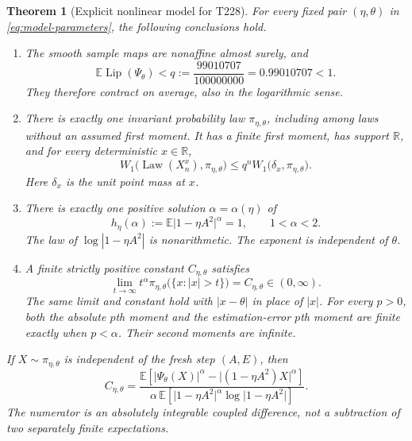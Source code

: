 \documentclass[11pt,a4paper]{article}
\numberwithin{equation}{section}
\newtheorem{theorem}{Theorem}[section]
\theoremstyle{remark}
\DeclareMathOperator{\Lip}{Lip}
\DeclareMathOperator{\Law}{Law}
\newcommand{\E}{\mathbb E}
\newcommand{\R}{\mathbb R}
\newcommand{\abs}[1]{\lvert#1\rvert}
\begin{document}
\begin{theorem}[Explicit nonlinear model for T228]\label{thm:main}
For every fixed pair $(\eta,\theta)$ in \eqref{eq:model-parameters}, the
following conclusions hold.
\begin{enumerate}[label=\textnormal{(\roman*)}]
\item The smooth sample maps are nonaffine almost surely, and
\begin{equation}
 \E\Lip(\Psi_\theta)<q:=\frac{99010707}{100000000}
 =0.99010707<1.\label{eq:q-main}
\end{equation}
They therefore contract on average, also in the logarithmic sense.
\item There is exactly one invariant probability law $\pi_{\eta,\theta}$,
including among laws without an assumed first moment. It has a finite
first moment, has support $\R$, and for every deterministic $x\in\R$,
\begin{equation}
 W_1\bigl(\Law(X_n^x),\pi_{\eta,\theta}\bigr)
 \le q^n W_1\bigl(\delta_x,\pi_{\eta,\theta}\bigr).
 \label{eq:wasserstein}
\end{equation}
Here $\delta_x$ is the unit point mass at $x$.
\item There is exactly one positive solution $\alpha=\alpha(\eta)$ of
\begin{equation}
 h_\eta(\alpha):=\E\abs{1-\eta A^2}^\alpha=1,
 \qquad 1<\alpha<2.\label{eq:alpha-main}
\end{equation}
The law of $\log|1-\eta A^2|$ is nonarithmetic. The exponent is independent
of $\theta$.
\item A finite strictly positive constant $C_{\eta,\theta}$ satisfies
\begin{equation}
 \lim_{t\to\infty}t^\alpha\pi_{\eta,\theta}
 \bigl(\{x:\abs{x}>t\}\bigr)=C_{\eta,\theta}\in(0,\infty).
 \label{eq:tail-main}
\end{equation}
The same limit and constant hold with $|x-\theta|$ in place of $|x|$.
For every $p>0$, both the absolute $p$th moment and the estimation-error
$p$th moment are finite exactly when $p<\alpha$. Their second moments
are infinite.
\end{enumerate}
If $X\sim\pi_{\eta,\theta}$ is independent of the fresh step $(A,E)$, then
\begin{equation}
 C_{\eta,\theta}
 =\frac{\E\!\left[\abs{\Psi_\theta(X)}^\alpha
                   -\abs{(1-\eta A^2)X}^\alpha\right]}
 {\alpha\,\E\!\left[\abs{1-\eta A^2}^\alpha
                         \log\abs{1-\eta A^2}\right]}.
 \label{eq:constant-main}
\end{equation}
The numerator is an absolutely integrable \emph{coupled difference}, not
a subtraction of two separately finite expectations.
\end{theorem}
\end{document}

